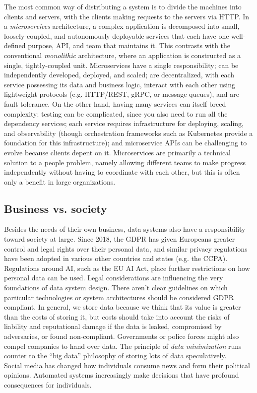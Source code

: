 \documentclass[table, xcdraw]{article}%
\begin{document}
The most common way of distributing a system is to divide the machines into clients and servers, with the clients making requests to the servers via HTTP. In a \textit{microservices} architecture, a complex application is decomposed into small, loosely-coupled, and autonomously deployable services that each have one well-defined purpose, API, and team that maintains it. This contrasts with the conventional \textit{monolithic} architecture, where an application is constructed as a single, tightly-coupled unit. Microservices have a single responsibility; can be independently developed, deployed, and scaled; are decentralized, with each service possessing its data and business logic, interact with each other using lightweight protocols (e.g. HTTP/REST, gRPC, or message queues), and are fault tolerance. On the other hand, having many services can itself breed complexity: testing can be complicated, since you also need to run all the dependency services; each service requires infrastructure for deploying, scaling, and observability (though orchestration frameworks such as Kubernetes provide a foundation for this infrastructure); and microservice APIs can be challenging to evolve because clients depent on it. Microservices are primarily a technical solution to a people problem, namely allowing different teams to make progress independently without having to coordinate with each other, but this is often only a benefit in large organizations.

\subsection{Business vs. society}

Besides the needs of their own business, data systems also have a responsibility toward society at large. Since 2018, the GDPR has given Europeans greater control and legal rights over their personal data, and similar privacy regulations have been adopted in various other countries and states (e.g. the CCPA). Regulations around AI, such as the EU AI Act, place further restrictions on how personal data can be used. Legal considerations are influencing the very foundations of data system design. There aren't clear guidelines on which particular technologies or system architectures should be considered GDPR compliant. In general, we store data because we think that its value is greater than the costs of storing it, but costs should take into account the risks of liability and reputational damage if the data is leaked, compromised by adversaries, or found non-compliant. Governments or police forces might also compel companies to hand over data. The principle of \textit{data minimization} runs counter to the “big data” philosophy of storing lots of data speculatively.\\
Social media has changed how individuals consume news and form their political opinions. Automated systems increasingly make decisions that have profound consequences for individuals.
\end{document}
